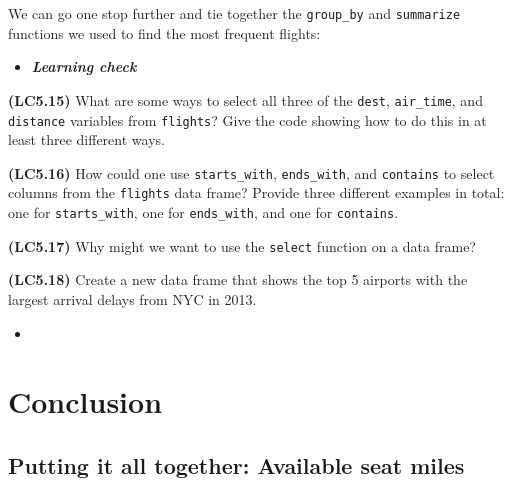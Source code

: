 \documentclass[12pt,]{krantz}
\makeatletter
\newenvironment{Shaded}{\begin{snugshade}}{\end{snugshade}}
\newcommand{\KeywordTok}[1]{\textcolor[rgb]{0.27,0.27,0.27}{\textbf{#1}}}
\newcommand{\DataTypeTok}[1]{\textcolor[rgb]{0.27,0.27,0.27}{#1}}
\newcommand{\DecValTok}[1]{\textcolor[rgb]{0.06,0.06,0.06}{#1}}
\newcommand{\StringTok}[1]{\textcolor[rgb]{0.5,0.5,0.5}{#1}}
\newcommand{\OperatorTok}[1]{\textcolor[rgb]{0.43,0.43,0.43}{\textbf{#1}}}
\newcommand{\NormalTok}[1]{#1}
\newenvironment{kframe}{%
\medskip{}
\setlength{\fboxsep}{.8em}
 \def\at@end@of@kframe{}%
 \ifinner\ifhmode%
  \def\at@end@of@kframe{\end{minipage}}%
  \begin{minipage}{\columnwidth}%
 \fi\fi%
 \def\FrameCommand##1{\hskip\@totalleftmargin \hskip-\fboxsep
 \colorbox{shadecolor}{##1}\hskip-\fboxsep
     \hskip-\linewidth \hskip-\@totalleftmargin \hskip\columnwidth}%
 \MakeFramed {\advance\hsize-\width
   \@totalleftmargin\z@ \linewidth\hsize
   \@setminipage}}%
 {\par\unskip\endMakeFramed%
 \at@end@of@kframe}
\renewenvironment{Shaded}{\begin{kframe}}{\end{kframe}}
\newenvironment{rmdblock}[1]
  {\begin{shaded*}
  \begin{itemize}
  \renewcommand{\labelitemi}{
    \raisebox{-.7\height}[0pt][0pt]{
    }
  }
  \item
  }
  {
  \end{itemize}
  \end{shaded*}
  }
\newenvironment{learncheck}
  {\begin{rmdblock}{warning}}
  {\end{rmdblock}}
\theoremstyle{definition}
\theoremstyle{definition}
\theoremstyle{definition}
\theoremstyle{remark}
\makeatother
\begin{document}
We can go one stop further and tie together the \texttt{group\_by} and
\texttt{summarize} functions we used to find the most frequent flights:

\begin{Shaded}
\end{Shaded}

\begin{learncheck}
\textbf{\emph{Learning check}}
\end{learncheck}

\textbf{(LC5.15)} What are some ways to select all three of the
\texttt{dest}, \texttt{air\_time}, and \texttt{distance} variables from
\texttt{flights}? Give the code showing how to do this in at least three
different ways.

\textbf{(LC5.16)} How could one use \texttt{starts\_with},
\texttt{ends\_with}, and \texttt{contains} to select columns from the
\texttt{flights} data frame? Provide three different examples in total:
one for \texttt{starts\_with}, one for \texttt{ends\_with}, and one for
\texttt{contains}.

\textbf{(LC5.17)} Why might we want to use the \texttt{select} function
on a data frame?

\textbf{(LC5.18)} Create a new data frame that shows the top 5 airports
with the largest arrival delays from NYC in 2013.

\begin{learncheck}

\end{learncheck}

\section{Conclusion}\label{conclusion-3}

\subsection{Putting it all together: Available seat
miles}\label{putting-it-all-together-available-seat-miles}
\end{document}
